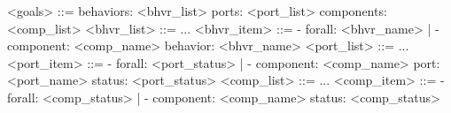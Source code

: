 <goals> ::= behaviors: <bhvr_list> 
           ports: <port_list> 
           components: <comp_list>
<bhvr_list> ::= ...
<bhvr_item> ::= - forall: <bhvr_name> 
             | - component: <comp_name> 
                 behavior: <bhvr_name>
<port_list> ::= ...
<port_item> ::= - forall: <port_status> 
             | - component: <comp_name> 
                 port: <port_name>
                 status: <port_status>
<comp_list> ::= ...
<comp_item> ::= - forall: <comp_status> 
             | - component: <comp_name> 
                 status: <comp_status>